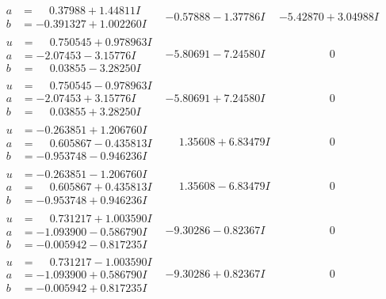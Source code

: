 \documentclass[1p]{elsarticle_modified}
\theoremstyle{definition}
\begin{document}
$$\begin{array}{c|c|c}
\begin{aligned}
a &= \phantom{-}0.37988 + 1.44811 I \\
b &= -0.391327 + 1.002260 I\end{aligned}
 & -0.57888 - 1.37786 I & -5.42870 + 3.04988 I \\ \hline\begin{aligned}
u &= \phantom{-}0.750545 + 0.978963 I \\
a &= -2.07453 - 3.15776 I \\
b &= \phantom{-}0.03855 - 3.28250 I\end{aligned}
 & -5.80691 - 7.24580 I & \phantom{-0.000000 } 0 \\ \hline\begin{aligned}
u &= \phantom{-}0.750545 - 0.978963 I \\
a &= -2.07453 + 3.15776 I \\
b &= \phantom{-}0.03855 + 3.28250 I\end{aligned}
 & -5.80691 + 7.24580 I & \phantom{-0.000000 } 0 \\ \hline\begin{aligned}
u &= -0.263851 + 1.206760 I \\
a &= \phantom{-}0.605867 - 0.435813 I \\
b &= -0.953748 - 0.946236 I\end{aligned}
 & \phantom{-}1.35608 + 6.83479 I & \phantom{-0.000000 } 0 \\ \hline\begin{aligned}
u &= -0.263851 - 1.206760 I \\
a &= \phantom{-}0.605867 + 0.435813 I \\
b &= -0.953748 + 0.946236 I\end{aligned}
 & \phantom{-}1.35608 - 6.83479 I & \phantom{-0.000000 } 0 \\ \hline\begin{aligned}
u &= \phantom{-}0.731217 + 1.003590 I \\
a &= -1.093900 - 0.586790 I \\
b &= -0.005942 - 0.817235 I\end{aligned}
 & -9.30286 - 0.82367 I & \phantom{-0.000000 } 0 \\ \hline\begin{aligned}
u &= \phantom{-}0.731217 - 1.003590 I \\
a &= -1.093900 + 0.586790 I \\
b &= -0.005942 + 0.817235 I\end{aligned}
 & -9.30286 + 0.82367 I & \phantom{-0.000000 } 0\\

\end{array}$$
\end{document}
